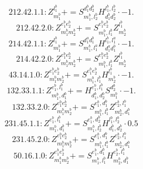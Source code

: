 \documentclass[letterpaper,10pt,fleqn,leqno,onecolumn]{article}
\begin{document}
\begin{equation} \;\;\;\;\;\;  212.42.1.1: Z^{l_{1}^{b}}_{m_{1}^{b}}+=S^{d_{1}^{b}d_{2}^{b}}_{m_{1}^{b},l_{2}^{b}}H^{l_{1}^{b},l_{2}^{b}}_{d_{1}^{b}d_{2}^{b}}\cdot -1. \end{equation}
\begin{equation} \;\;\;\;\;\;  212.42.2.0: Z^{e_{1}^{b}e_{2}^{b}}_{m_{1}^{b}m_{2}^{b}}+=S^{e_{1}^{b}e_{2}^{b}}_{m_{1}^{b},l_{1}^{b}}Z^{l_{1}^{b}}_{m_{2}^{b}} \end{equation}
\begin{equation} \;\;\;\;\;\;  214.42.1.1: Z^{l_{1}^{b}}_{m_{1}^{b}}+=S^{d_{1}^{a}d_{1}^{b}}_{m_{1}^{b},l_{1}^{a}}H^{l_{1}^{b},l_{1}^{a}}_{d_{1}^{a}d_{1}^{b}}\cdot -1. \end{equation}
\begin{equation} \;\;\;\;\;\;  214.42.2.0: Z^{e_{1}^{b}e_{2}^{b}}_{m_{1}^{b}m_{2}^{b}}+=S^{e_{1}^{b}e_{2}^{b}}_{m_{1}^{b},l_{1}^{b}}Z^{l_{1}^{b}}_{m_{2}^{b}} \end{equation}
\begin{equation} \;\;\;\;\;\;  43.14.1.0: Z^{e_{1}^{b}e_{2}^{b}}_{m_{1}^{b}m_{2}^{b}}+=S^{e_{1}^{b}e_{2}^{b}}_{m_{1}^{b},l_{1}^{b}}H^{l_{1}^{b}}_{m_{2}^{b}}\cdot -1. \end{equation}
\begin{equation} \;\;\;\;\;\;  132.33.1.1: Z^{e_{1}^{b},l_{1}^{b}}_{m_{1}^{b},d_{1}^{b}}+=H^{e_{1}^{b},l_{1}^{b}}_{d_{1}^{b},d_{2}^{b}}S^{d_{2}^{b}}_{m_{1}^{b}}\cdot -1. \end{equation}
\begin{equation} \;\;\;\;\;\;  132.33.2.0: Z^{e_{1}^{b}e_{2}^{b}}_{m_{1}^{b}m_{2}^{b}}+=S^{e_{1}^{b},d_{1}^{b}}_{m_{1}^{b},l_{1}^{b}}Z^{e_{2}^{b},l_{1}^{b}}_{m_{2}^{b},d_{1}^{b}} \end{equation}
\begin{equation} \;\;\;\;\;\;  231.45.1.1: Z^{e_{1}^{b},l_{1}^{b}}_{m_{1}^{b},d_{1}^{b}}+=S^{e_{1}^{b},d_{2}^{b}}_{m_{1}^{b},l_{2}^{b}}H^{l_{1}^{b},l_{2}^{b}}_{d_{1}^{b},d_{2}^{b}}\cdot 0.5 \end{equation}
\begin{equation} \;\;\;\;\;\;  231.45.2.0: Z^{e_{1}^{b}e_{2}^{b}}_{m_{1}^{b}m_{2}^{b}}+=S^{e_{1}^{b},d_{1}^{b}}_{m_{1}^{b},l_{1}^{b}}Z^{e_{2}^{b},l_{1}^{b}}_{m_{2}^{b},d_{1}^{b}} \end{equation}
\begin{equation} \;\;\;\;\;\;  50.16.1.0: Z^{e_{1}^{b}e_{2}^{b}}_{m_{1}^{b}m_{2}^{b}}+=S^{e_{1}^{b},d_{1}^{b}}_{m_{1}^{b},l_{1}^{b}}H^{e_{2}^{b},l_{1}^{b}}_{m_{2}^{b},d_{1}^{b}} \end{equation}
\end{document}
